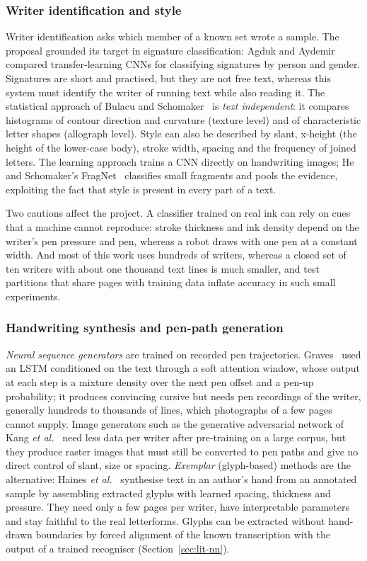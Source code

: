 \subsubsection{Writer identification and style}
\label{sec:lit-writer}

Writer identification asks which member of a known set wrote a sample. The proposal grounded its target in signature classification: Agduk and Aydemir~\cite{agduk2022} compared transfer-learning CNNs for classifying signatures by person and gender. Signatures are short and practised, but they are not free text, whereas this system must identify the writer of running text while also reading it. The statistical approach of Bulacu and Schomaker~\cite{bulacu2007} is \emph{text independent}: it compares histograms of contour direction and curvature (texture level) and of characteristic letter shapes (allograph level). Style can also be described by slant, x-height (the height of the lower-case body), stroke width, spacing and the frequency of joined letters. The learning approach trains a CNN directly on handwriting images; He and Schomaker's FragNet~\cite{he2020} classifies small fragments and pools the evidence, exploiting the fact that style is present in every part of a text.

Two cautions affect the project. A classifier trained on real ink can rely on cues that a machine cannot reproduce: stroke thickness and ink density depend on the writer's pen pressure and pen, whereas a robot draws with one pen at a constant width. And most of this work uses hundreds of writers, whereas a closed set of ten writers with about one thousand text lines is much smaller, and test partitions that share pages with training data inflate accuracy in such small experiments.

\subsubsection{Handwriting synthesis and pen-path generation}
\label{sec:lit-synth}

\emph{Neural sequence generators} are trained on recorded pen trajectories. Graves~\cite{graves2013} used an LSTM conditioned on the text through a soft attention window, whose output at each step is a mixture density over the next pen offset and a pen-up probability; it produces convincing cursive but needs pen recordings of the writer, generally hundreds to thousands of lines, which photographs of a few pages cannot supply. Image generators such as the generative adversarial network of Kang \emph{et al.}~\cite{kang2020} need less data per writer after pre-training on a large corpus, but they produce raster images that must still be converted to pen paths and give no direct control of slant, size or spacing. \emph{Exemplar} (glyph-based) methods are the alternative: Haines \emph{et al.}~\cite{haines2016} synthesise text in an author's hand from an annotated sample by assembling extracted glyphs with learned spacing, thickness and pressure. They need only a few pages per writer, have interpretable parameters and stay faithful to the real letterforms. Glyphs can be extracted without hand-drawn boundaries by forced alignment of the known transcription with the output of a trained recogniser (Section~\ref{sec:lit-nn}).


